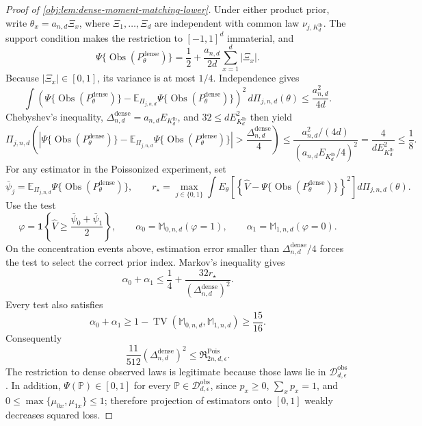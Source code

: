 \begin{proof}[Proof of \cref{obj:lem:dense-moment-matching-lower}]
Under either product prior, write \(\theta_x=a_{n,d}\Xi_x\), where \(\Xi_1,\ldots,\Xi_d\) are independent with common law \(\nu_{j,K_d^{\mathrm{lb}}}\). The support condition makes the restriction to \([-1,1]^d\) immaterial, and
\[
\Psi\{\operatorname{Obs}(P_\theta^{\mathrm{dense}})\}
=
\frac12+\frac{a_{n,d}}{2d}\sum_{x=1}^d|\Xi_x|.
\]
Because \(|\Xi_x|\in[0,1]\), its variance is at most \(1/4\). Independence gives
\[
\int
\left(\Psi\{\operatorname{Obs}(P_\theta^{\mathrm{dense}})\}
-\mathbb E_{\Pi_{j,n,d}}\Psi\{\operatorname{Obs}(P_\theta^{\mathrm{dense}})\}\right)^2
\,d\Pi_{j,n,d}(\theta)
\le
\frac{a_{n,d}^2}{4d}.
\]
Chebyshev's inequality, \(\Delta_{n,d}^{\mathrm{dense}}=a_{n,d}E_{K_d^{\mathrm{lb}}}\), and \(32\le dE_{K_d^{\mathrm{lb}}}^2\) then yield
\[
\Pi_{j,n,d}\left(
\left|\Psi\{\operatorname{Obs}(P_\theta^{\mathrm{dense}})\}
-\mathbb E_{\Pi_{j,n,d}}\Psi\{\operatorname{Obs}(P_\theta^{\mathrm{dense}})\}\right|
>
\frac{\Delta_{n,d}^{\mathrm{dense}}}{4}
\right)
\le
\frac{a_{n,d}^2/(4d)}
{(a_{n,d}E_{K_d^{\mathrm{lb}}}/4)^2}
=
\frac4{dE_{K_d^{\mathrm{lb}}}^2}
\le
\frac18.
\]
For any estimator in the Poissonized experiment, set
\[
\bar\psi_j
=
\mathbb E_{\Pi_{j,n,d}}
\Psi\{\operatorname{Obs}(P_\theta^{\mathrm{dense}})\},
\qquad
r_\star
=
\max_{j\in\{0,1\}}
\int E_\theta\!\left[
\left\{\widehat V-\Psi\{\operatorname{Obs}(P_\theta^{\mathrm{dense}})\}\right\}^2
\right]d\Pi_{j,n,d}(\theta).
\]
Use the test
\[
\varphi=\mathbf 1\!\left\{\widehat V\ge\frac{\bar\psi_0+\bar\psi_1}{2}\right\},
\qquad
\alpha_0=\mathbb M_{0,n,d}(\varphi=1),
\qquad
\alpha_1=\mathbb M_{1,n,d}(\varphi=0).
\]
On the concentration events above, estimation error smaller than \(\Delta_{n,d}^{\mathrm{dense}}/4\) forces the test to select the correct prior index. Markov's inequality gives
\[
\alpha_0+\alpha_1
\le
\frac14+\frac{32r_\star}{(\Delta_{n,d}^{\mathrm{dense}})^2}.
\]
Every test also satisfies
\[
\alpha_0+\alpha_1
\ge
1-\operatorname{TV}(\mathbb M_{0,n,d},\mathbb M_{1,n,d})
\ge
\frac{15}{16}.
\]
Consequently
\[
\frac{11}{512}(\Delta_{n,d}^{\mathrm{dense}})^2
\le
\mathfrak R^{\mathrm{Pois}}_{2n,d,\epsilon}.
\]
The restriction to dense observed laws is legitimate because those laws lie in \(\mathcal D_{d,\epsilon}^{\mathrm{obs}}\). In addition, \(\Psi(\mathbb P)\in[0,1]\) for every \(\mathbb P\in\mathcal D_{d,\epsilon}^{\mathrm{obs}}\), since \(p_x\ge0\), \(\sum_xp_x=1\), and \(0\le\max\{\mu_{0x},\mu_{1x}\}\le1\); therefore projection of estimators onto \([0,1]\) weakly decreases squared loss.


\end{proof}
